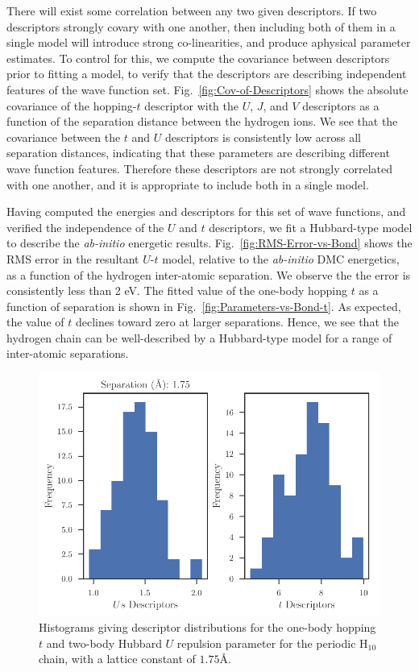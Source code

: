  There will exist some correlation between any two given descriptors. If two descriptors strongly covary with one another, then including both of them in a single model will introduce strong co-linearities, and produce aphysical parameter estimates. To control for this, we compute the covariance between descriptors prior to fitting a model, to verify that the descriptors are describing independent features of the wave function set. Fig.~\ref{fig:Cov-of-Descriptors} shows the absolute covariance of the hopping-$t$ descriptor with the $U$, $J$, and $V$ descriptors as a function of the separation distance between the hydrogen ions. We see that the covariance between the $t$ and $U$ descriptors is consistently low across all separation distances, indicating that these parameters are describing different wave function features. Therefore these descriptors are not strongly correlated with one another, and it is appropriate to include both in a single model.

Having computed the energies and descriptors for this set of wave functions, and verified the independence of the $U$ and $t$ descriptors, we fit a Hubbard-type model to describe the \textit{ab-initio} energetic results. Fig.~\ref{fig:RMS-Error-vs-Bond} shows the RMS error in the resultant $U$-$t$ model, relative to the \textit{ab-initio} DMC energetics, as a function of the hydrogen inter-atomic separation. We observe the the error is consistently less than 2 eV. The fitted value of the one-body hopping $t$ as a function of separation is shown in Fig.~\ref{fig:Parameters-vs-Bond-t}. As expected, the value of $t$ declines toward zero at larger separations. Hence, we see that the hydrogen chain can be well-described by a Hubbard-type model for a range of inter-atomic separations.

\begin{figure}
\centering
\includegraphics[scale=0.7]{./Figures/Spin0_pbe_H_relation.pdf}
\caption{Histograms giving descriptor distributions for the one-body hopping $t$ and two-body Hubbard $U$ repulsion parameter for the periodic H$_{10}$ chain, with a lattice constant of $1.75$\AA.}\label{fig:Histogram-of-Parameter-Values}
 \end{figure}
 

